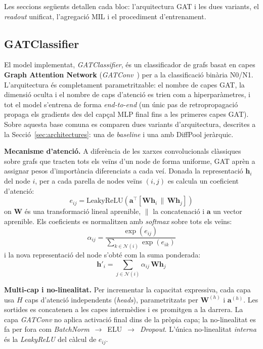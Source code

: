 \documentclass[10pt,a4paper,twocolumn,twoside]{article}
\begin{document}
Les seccions següents detallen cada bloc: l'arquitectura GAT i les dues variants, el
\textit{readout} unificat, l'agregació MIL i el procediment d'entrenament.

\subsection{GATClassifier}

El model implementat, \textit{GATClassifier}, és un classificador de grafs basat en capes
\textbf{Graph Attention Network} (\textit{GATConv}~\cite{veličković2018graphattentionnetworks,fey2019fastgraphrepresentationlearning})
per a la classificació binària N0/N1. L'arquitectura és completament parametritzable: el nombre de
capes GAT, la dimensió oculta i el nombre de caps d'atenció es trien com a hiperparàmetres, i tot
el model s'entrena de forma \textit{end-to-end} (un únic pas de retropropagació propaga els gradients
des del capçal MLP final fins a les primeres capes GAT). Sobre aquesta base comuna es comparen dues
variants d'arquitectura, descrites a la Secció~\ref{sec:architectures}: una de \textit{baseline} i una
amb DiffPool jeràrquic.

\textbf{Mecanisme d'atenció.} A diferència de les xarxes convolucionals clàssiques sobre grafs que tracten
tots els veïns d'un node de forma uniforme, GAT aprèn a assignar pesos d'importància diferenciats a cada
veí. Donada la representació $\mathbf{h}_i$ del node $i$, per a cada parella de nodes
veïns $(i, j)$ es calcula un coeficient d'atenció:
\begin{equation*}
  e_{ij} = \text{LeakyReLU}\!\left(\mathbf{a}^{\top}[\mathbf{W}\mathbf{h}_i \,\|\, \mathbf{W}\mathbf{h}_j]\right)
\end{equation*}
on $\mathbf{W}$ és una transformació lineal aprenible, $\|$ la concatenació i $\mathbf{a}$ un vector
aprenible. Els coeficients es normalitzen amb \textit{softmax} sobre tots els veïns:
\begin{equation*}
  \alpha_{ij} = \frac{\exp(e_{ij})}{\sum_{k \in \mathcal{N}(i)} \exp(e_{ik})}
\end{equation*}
i la nova representació del node s'obté com la suma ponderada:
\begin{equation*}
  \mathbf{h}'_i = \sum_{j \in \mathcal{N}(i)} \alpha_{ij}\,\mathbf{W}\mathbf{h}_j
\end{equation*}

\textbf{Multi-cap i no-linealitat.} Per incrementar la capacitat expressiva, cada capa usa $H$ caps
d'atenció independents (\textit{heads}), parametritzats per $\mathbf{W}^{(h)}$ i $\mathbf{a}^{(h)}$.
Les sortides es concatenen a les capes intermèdies i es promitgen a la darrera. La capa
\textit{GATConv} no aplica activació final dins de la pròpia capa; la no-linealitat es fa per fora
com \textit{BatchNorm}~$\to$~ELU~$\to$~\textit{Dropout}. L'única no-linealitat \textit{interna} és
la \textit{LeakyReLU} del càlcul de $e_{ij}$.
\end{document}
